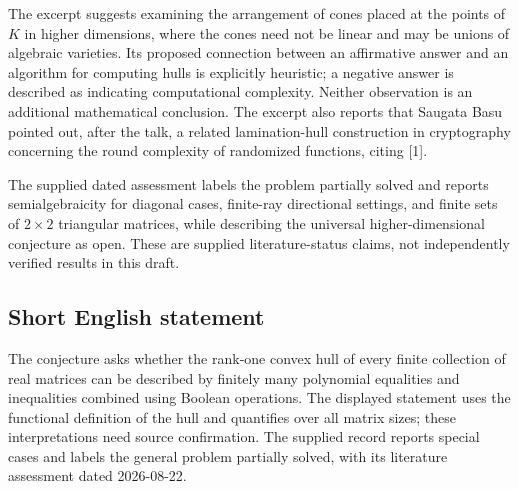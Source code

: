 \documentclass[11pt]{article}
\begin{document}
The excerpt suggests examining the arrangement of cones placed at the points of \(K\) in higher dimensions, where the cones need not be linear and may be unions of algebraic varieties. Its proposed connection between an affirmative answer and an algorithm for computing hulls is explicitly heuristic; a negative answer is described as indicating computational complexity. Neither observation is an additional mathematical conclusion. The excerpt also reports that Saugata Basu pointed out, after the talk, a related lamination-hull construction in cryptography concerning the round complexity of randomized functions, citing [1].

The supplied dated assessment labels the problem partially solved and reports semialgebraicity for diagonal cases, finite-ray directional settings, and finite sets of \(2\times2\) triangular matrices, while describing the universal higher-dimensional conjecture as open. These are supplied literature-status claims, not independently verified results in this draft.
\subsection{Short English statement}
The conjecture asks whether the rank-one convex hull of every finite collection of real matrices can be described by finitely many polynomial equalities and inequalities combined using Boolean operations. The displayed statement uses the functional definition of the hull and quantifies over all matrix sizes; these interpretations need source confirmation. The supplied record reports special cases and labels the general problem partially solved, with its literature assessment dated 2026-08-22.
\end{document}
